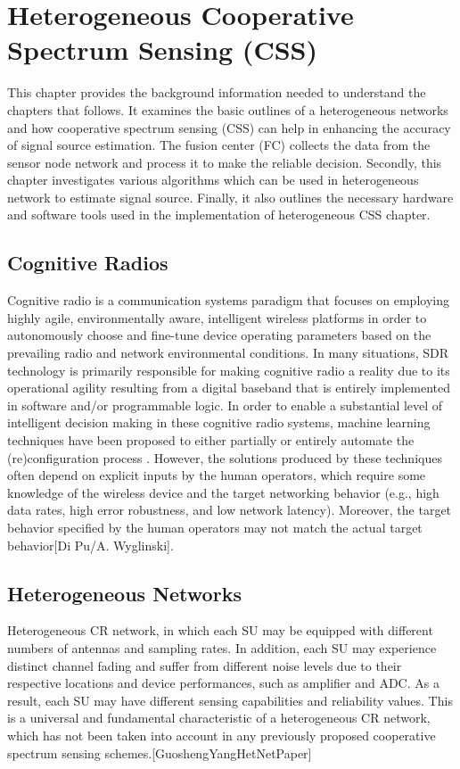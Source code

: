 \chapter{Heterogeneous Cooperative Spectrum Sensing (CSS)}
\label{chapter2}

This chapter provides the background information needed to understand the chapters that follows. It examines the basic outlines of a heterogeneous networks and how cooperative spectrum sensing (CSS)
can help in enhancing the accuracy of signal source estimation. The fusion center (FC) collects the data from the sensor node network and process it to make the reliable decision. Secondly, this chapter investigates various algorithms which can be used in heterogeneous network to estimate signal source. Finally, it also outlines the necessary hardware and software tools used in the implementation of heterogeneous CSS chapter.

\section{Cognitive Radios}
Cognitive radio is a communication systems paradigm that focuses on employing highly agile, environmentally aware, intelligent wireless platforms in
order to autonomously choose and fine-tune device operating parameters based
on the prevailing radio and network environmental conditions. In many situations, SDR technology is primarily responsible for making cognitive radio
a reality due to its operational agility resulting from a digital baseband that is
entirely implemented in software and/or programmable logic. In order to enable a substantial level of intelligent decision making in these cognitive radio systems, machine learning techniques have been proposed to either partially or entirely automate the (re)configuration process . However, the solutions produced by these techniques often depend on explicit inputs by the human operators, which require some knowledge of the wireless device and the target networking behavior (e.g., high data rates, high error robustness, and low network latency). Moreover, the target behavior specified by the human operators may not match the actual target behavior[Di Pu/A. Wyglinski].

\section{Heterogeneous Networks}
Heterogeneous CR network, in which each SU may be equipped with different numbers of antennas and sampling
rates. In addition, each SU may experience distinct channel fading and suffer from different noise levels due to their respective
locations and device performances, such as amplifier and ADC. As a result, each SU may have different sensing capabilities
and reliability values. This is a universal and fundamental characteristic of a heterogeneous CR network, which has not
been taken into account in any previously proposed cooperative spectrum sensing schemes.[GuoshengYangHetNetPaper]

